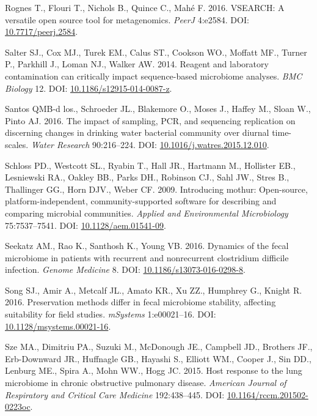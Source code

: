 \documentclass[12pt,]{article}
\begin{document}
\hypertarget{ref-vsearch_Rognes_2016}{}
Rognes T., Flouri T., Nichols B., Quince C., Mahé F. 2016. VSEARCH: A
versatile open source tool for metagenomics. \emph{PeerJ} 4:e2584. DOI:
\href{https://doi.org/10.7717/peerj.2584}{10.7717/peerj.2584}.

\hypertarget{ref-contamination_Salter2014}{}
Salter SJ., Cox MJ., Turek EM., Calus ST., Cookson WO., Moffatt MF.,
Turner P., Parkhill J., Loman NJ., Walker AW. 2014. Reagent and
laboratory contamination can critically impact sequence-based microbiome
analyses. \emph{BMC Biology} 12. DOI:
\href{https://doi.org/10.1186/s12915-014-0087-z}{10.1186/s12915-014-0087-z}.

\hypertarget{ref-BautistadelosSantos2016}{}
Santos QMB-d los., Schroeder JL., Blakemore O., Moses J., Haffey M.,
Sloan W., Pinto AJ. 2016. The impact of sampling, PCR, and sequencing
replication on discerning changes in drinking water bacterial community
over diurnal time-scales. \emph{Water Research} 90:216--224. DOI:
\href{https://doi.org/10.1016/j.watres.2015.12.010}{10.1016/j.watres.2015.12.010}.

\hypertarget{ref-mothur_schloss_2009}{}
Schloss PD., Westcott SL., Ryabin T., Hall JR., Hartmann M., Hollister
EB., Lesniewski RA., Oakley BB., Parks DH., Robinson CJ., Sahl JW.,
Stres B., Thallinger GG., Horn DJV., Weber CF. 2009. Introducing mothur:
Open-source, platform-independent, community-supported software for
describing and comparing microbial communities. \emph{Applied and
Environmental Microbiology} 75:7537--7541. DOI:
\href{https://doi.org/10.1128/aem.01541-09}{10.1128/aem.01541-09}.

\hypertarget{ref-erin_seekatz_2016}{}
Seekatz AM., Rao K., Santhosh K., Young VB. 2016. Dynamics of the fecal
microbiome in patients with recurrent and nonrecurrent clostridium
difficile infection. \emph{Genome Medicine} 8. DOI:
\href{https://doi.org/10.1186/s13073-016-0298-8}{10.1186/s13073-016-0298-8}.

\hypertarget{ref-preservation_Song_2016}{}
Song SJ., Amir A., Metcalf JL., Amato KR., Xu ZZ., Humphrey G., Knight
R. 2016. Preservation methods differ in fecal microbiome stability,
affecting suitability for field studies. \emph{mSystems} 1:e00021--16.
DOI:
\href{https://doi.org/10.1128/msystems.00021-16}{10.1128/msystems.00021-16}.

\hypertarget{ref-Sze2015}{}
Sze MA., Dimitriu PA., Suzuki M., McDonough JE., Campbell JD., Brothers
JF., Erb-Downward JR., Huffnagle GB., Hayashi S., Elliott WM., Cooper
J., Sin DD., Lenburg ME., Spira A., Mohn WW., Hogg JC. 2015. Host
response to the lung microbiome in chronic obstructive pulmonary
disease. \emph{American Journal of Respiratory and Critical Care
Medicine} 192:438--445. DOI:
\href{https://doi.org/10.1164/rccm.201502-0223oc}{10.1164/rccm.201502-0223oc}.
\end{document}
